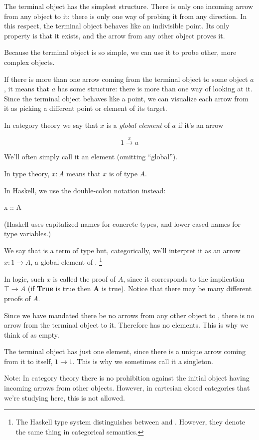 \documentclass[DaoFP]{subfiles}
\begin{document}
The terminal object has the simplest structure. There is only one incoming arrow from any object to it: there is only one way of probing it from any direction. In this respect, the terminal object behaves like an indivisible point. Its only property is that it exists, and the arrow from any other object proves it. 

Because the terminal object is so simple, we can use it to probe other, more complex objects. 

If there is more than one arrow coming from the terminal object to some object $a$, it means that $a$ has some structure: there is more than one way of looking at it. Since the terminal object behaves like a point, we can visualize each arrow from it as picking a different point or element of its target. 

In category theory we say that $ x$ is a \emph{global element} of $a$ if it's an arrow

\[ 1 \xrightarrow x a \]

We'll often simply call it an element (omitting ``global'').

In type theory, $ x \colon A$ means that $x$ is of type $A$.

In Haskell, we use the double-colon notation instead:
\begin{haskell}
x :: A
\end{haskell}
(Haskell uses capitalized names for concrete types, and lower-cased names for type variables.)

We say that  is a term of type  but, categorically, we'll interpret it as an arrow $x : 1 \to A$, a global element of . \footnote{The Haskell type system distinguishes between  and . However, they denote the same thing in categorical semantics.}

In logic, such $ x$ is called the proof of $ A$, since it corresponds to the implication $ \top \to A$ (if \textbf{True} is true then \textbf{A} is true). Notice that there may be many different proofs of $A$.

Since we have mandated there be no arrows from any other object to , there is no arrow from the terminal object to it. Therefore  has no elements. This is why we think of  as empty.

The terminal object has just one element, since there is a unique arrow coming from it to itself, $ 1 \to 1$. This is why we sometimes call it a singleton. 

Note: In category theory there is no prohibition against the initial object having incoming arrows from other objects. However, in cartesian closed categories that we're studying here, this is not allowed.
\end{document}
